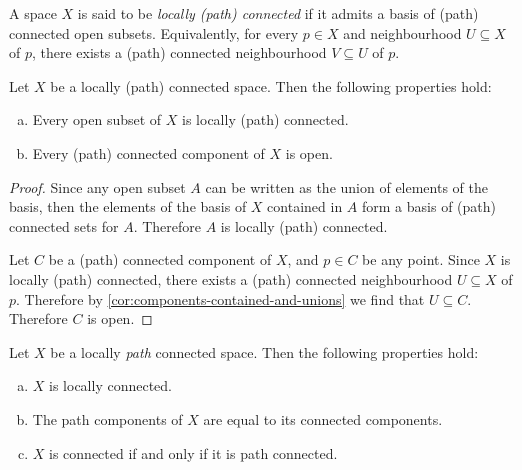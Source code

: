 \begin{definition}
\label{def:local-connected}
A space \(X\) is said to be \emph{locally (path) connected} if it admits a basis
of (path) connected open subsets. Equivalently, for every \(p \in X\) and
neighbourhood \(U \subseteq X\) of \(p\), there exists a (path) connected
neighbourhood \(V \subseteq U\) of \(p\).
\end{definition}

\begin{proposition}
\label{prop:locally-conn-space-properties}
Let \(X\) be a locally (path) connected space. Then the following properties
hold:
\begin{enumerate}[(a)]\setlength\itemsep{0em}
\item Every open subset of \(X\) is locally (path) connected.

\item Every (path) connected component of \(X\) is open.
\end{enumerate}
\end{proposition}

\begin{proof}
Since any open subset \(A\) can be written as the union of elements of the
basis, then the elements of the basis of \(X\) contained in \(A\) form a basis
of (path) connected sets for \(A\). Therefore \(A\) is locally (path) connected.

Let \(C\) be a (path) connected component of \(X\), and \(p \in C\) be any
point. Since \(X\) is locally (path) connected, there exists a (path) connected
neighbourhood \(U \subseteq X\) of \(p\). Therefore by
\cref{cor:components-contained-and-unions} we find that \(U \subseteq
C\). Therefore \(C\) is open.
\end{proof}

\begin{proposition}
\label{prop:locally-path-conn-space-properties}
Let \(X\) be a locally \emph{path} connected space. Then the following
properties hold:
\begin{enumerate}[(a)]\setlength\itemsep{0em}
\item \(X\) is locally connected.

\item The path components of \(X\) are equal to its connected components.

\item \(X\) is connected if and only if it is path connected.
\end{enumerate}
\end{proposition}

